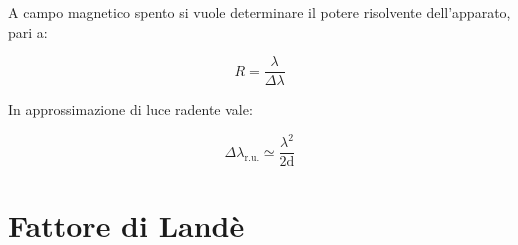 \documentclass[twocolumn,10pt]{asme2ej}
\begin{document}

A campo magnetico spento si vuole determinare il potere risolvente dell'apparato, pari a:

\begin{equation}
    R = \frac{\lambda}{\Delta \lambda}
\end{equation}

In approssimazione di luce radente vale:

\begin{equation}
    \Delta \lambda_{\text{r.u.}} \simeq \frac{\lambda^2}{2\text{d}}
    \label{e:lambdaru}
\end{equation}











\section{Fattore di Landè}\label{s:lande}
\end{document}
